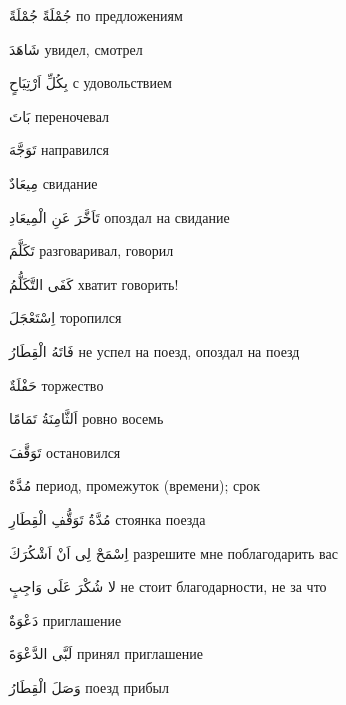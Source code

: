 \documentclass[a5paper]{article}
\newcommand\textstyleDropCaps[1]{#1}
\newcommand\textstyleCaptioncharacters[1]{#1}
\begin{document}
\textstyleCaptioncharacters{جُمْلَةً جُمْلَةً }\textstyleDropCaps{по предло­жениям‎}

\textstyleCaptioncharacters{شَاهَدَ }\textstyleDropCaps{увидел, смотрел‎}

\textstyleCaptioncharacters{بِكُلِّ اَرْتِيَاحٍ }\textstyleDropCaps{с удоволь­ствием‎}

\textstyleCaptioncharacters{بَاتَ }\textstyleDropCaps{переночевал‎}

\textstyleCaptioncharacters{تَوَجَّهَ }\textstyleDropCaps{направился‎}

\textstyleCaptioncharacters{مِيعَادٌ }\textstyleDropCaps{свидание‎}

\textstyleCaptioncharacters{تَاَخَّرَ عَنِ الْمِيعَادِ }\textstyleDropCaps{опоз­дал на свидание‎}

\textstyleCaptioncharacters{تَكَلَّمَ }\textstyleDropCaps{разговаривал, гово­рил‎}

\textstyleCaptioncharacters{كَفَى التَّكَلُّمُ }\textstyleDropCaps{хватит го­ворить!‎}

\textstyleCaptioncharacters{اِسْتَعْجَلَ }\textstyleDropCaps{торопился‎}

\textstyleCaptioncharacters{فَاتَهُ الْقِطَارُ }\textstyleDropCaps{не успел на поезд, опоздал на поезд‎}

\textstyleCaptioncharacters{حَفْلَةٌ }\textstyleDropCaps{торжество‎}

\textstyleCaptioncharacters{اَلثَّامِنَةُ تَمَامًا }\textstyleDropCaps{ровно во­семь‎}

\textstyleCaptioncharacters{تَوَقَّفَ }\textstyleDropCaps{остановился‎}

\textstyleCaptioncharacters{مُدَّةٌ }\textstyleDropCaps{период, промежуток (времени); срок‎}

\textstyleCaptioncharacters{مُدَّةُ تَوَقُّفِ الْقِطَارِ }\textstyleDropCaps{сто­янка поезда‎}

\textstyleCaptioncharacters{اِسْمَحْ لِى اَنْ اَشْكُرَكَ }\textstyleDropCaps{разрешите мне поблагодарить вас‎}

\textstyleCaptioncharacters{لا شُكْرَ عَلَى وَاجِبٍ }\textstyleDropCaps{не стоит благодарности, не за что‎}

\textstyleCaptioncharacters{دَعْوَةٌ }\textstyleDropCaps{приглашение‎}

\textstyleCaptioncharacters{لَبَّى الدَّعْوَةَ }\textstyleDropCaps{принял при­глашение‎}

\textstyleCaptioncharacters{وَصَلَ الْقِطَارُ }\textstyleDropCaps{поезд при­был‎}
\end{document}
